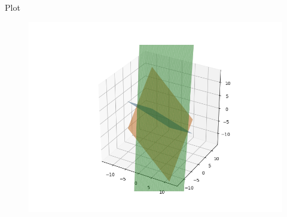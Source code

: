 \documentclass{beamer}
\begin{document}
\begin{frame}{Plot}
    \begin{figure}[H]
    \centering
    \includegraphics[width=0.6\columnwidth]{../figs/fig.png}
    \label{fig:1}
\end{figure}
\end{frame}
\end{document}
